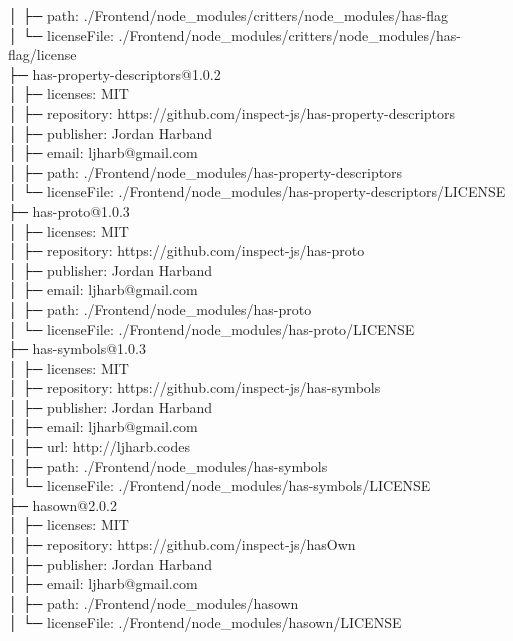 │  ├─ path: ./Frontend/node\_modules/critters/node\_modules/has-flag\\
│  └─ licenseFile: ./Frontend/node\_modules/critters/node\_modules/has-flag/license\\
├─ has-property-descriptors@1.0.2\\
│  ├─ licenses: MIT\\
│  ├─ repository: https://github.com/inspect-js/has-property-descriptors\\
│  ├─ publisher: Jordan Harband\\
│  ├─ email: ljharb@gmail.com\\
│  ├─ path: ./Frontend/node\_modules/has-property-descriptors\\
│  └─ licenseFile: ./Frontend/node\_modules/has-property-descriptors/LICENSE\\
├─ has-proto@1.0.3\\
│  ├─ licenses: MIT\\
│  ├─ repository: https://github.com/inspect-js/has-proto\\
│  ├─ publisher: Jordan Harband\\
│  ├─ email: ljharb@gmail.com\\
│  ├─ path: ./Frontend/node\_modules/has-proto\\
│  └─ licenseFile: ./Frontend/node\_modules/has-proto/LICENSE\\
├─ has-symbols@1.0.3\\
│  ├─ licenses: MIT\\
│  ├─ repository: https://github.com/inspect-js/has-symbols\\
│  ├─ publisher: Jordan Harband\\
│  ├─ email: ljharb@gmail.com\\
│  ├─ url: http://ljharb.codes\\
│  ├─ path: ./Frontend/node\_modules/has-symbols\\
│  └─ licenseFile: ./Frontend/node\_modules/has-symbols/LICENSE\\
├─ hasown@2.0.2\\
│  ├─ licenses: MIT\\
│  ├─ repository: https://github.com/inspect-js/hasOwn\\
│  ├─ publisher: Jordan Harband\\
│  ├─ email: ljharb@gmail.com\\
│  ├─ path: ./Frontend/node\_modules/hasown\\
│  └─ licenseFile: ./Frontend/node\_modules/hasown/LICENSE\\
